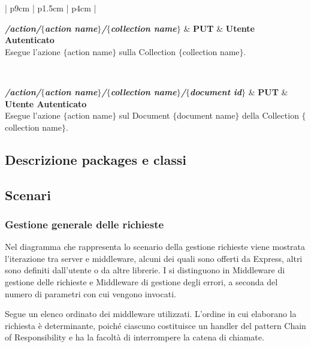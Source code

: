 \begin{center}
\begin{longtable}{| p{9cm} | p{1.5cm} | p{4cm} |}
	 {} \\ \hline
	
	\textbf{\emph{/action/$\{$action name$\}$/$\{$collection name$\}$}} & \textbf{PUT} & \textbf{Utente Autenticato} \\ \hline
	 {Esegue l'azione $\{$action name$\}$ sulla Collection $\{$collection name$\}$.}  \\ 
	\specialrule{1pt}{1pt}{1pt}
	
	 {} \\ \hline
	
	\textbf{\emph{/action/$\{$action name$\}$/$\{$collection name$\}$/$\{$document id$\}$}} & \textbf{PUT} & \textbf{Utente Autenticato} \\ \hline
	 {Esegue l'azione $\{$action name$\}$ sul Document $\{$document name$\}$ della Collection 
	$\{$collection name$\}$.}  \\ 
	\specialrule{1pt}{1pt}{1pt}

	
\end{longtable}
	  \egroup
\end{center}

\subsection{Descrizione packages e classi}



\subsection{Scenari}

\subsubsection{Gestione generale delle richieste}
Nel diagramma che rappresenta lo scenario della gestione richieste viene mostrata l'iterazione tra server e middleware, alcuni dei quali sono offerti da Express, altri sono definiti dall'utente o da altre librerie. I  si distinguono in Middleware di gestione delle richieste e Middleware di gestione degli errori, a seconda del numero di parametri con cui vengono invocati.

Segue un elenco ordinato dei middleware utilizzati. L'ordine in cui elaborano la richiesta è determinante, poiché ciascuno costituisce un handler del pattern Chain of Responsibility e ha la facoltà di interrompere la catena di chiamate.

